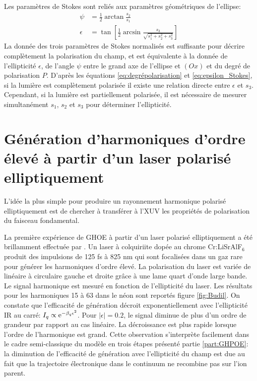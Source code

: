 Les paramètres de Stokes sont reliés aux paramètres géométriques de l'ellipse:
\begin{align}
\psi & = \frac{1}{2} \arctan \frac{s_2}{s_1} \label{eq:PsiStokes} \\
\epsilon & = \tan \left[ \frac{1}{2} \arcsin \frac{s_3}{\sqrt{s_1^2 + s_2^2 + s_3^2}} \right]
\label{eq:epsilon_Stokes}
\end{align}
La donnée des trois paramètres de Stokes normalisés est suffisante pour décrire complètement la polarisation du champ, et est équivalente à la donnée de l'ellipticité $\epsilon$, de l'angle $\psi$ entre le grand axe de l'ellipse et $(Ox)$ et du degré de polarisation $P$. D'après les équations \ref{eq:degrépolarisation} et \ref{eq:epsilon_Stokes}, si la lumière est complètement polarisée il existe une relation directe entre $\epsilon$ et $s_3$. Cependant, si la lumière est partiellement polarisée, il est nécessaire de mesurer simultanément $s_1$, $s_2$ et $s_3$ pour déterminer l'ellipticité.

\section{Génération d'harmoniques d'ordre élevé à partir d'un laser polarisé elliptiquement}
L'idée la plus simple pour produire un rayonnement harmonique polarisé elliptiquement est de chercher à transférer à l'XUV les propriétés de polarisation du faisceau fondamental.

La première expérience de GHOE à partir d'un laser polarisé elliptiquement a été brillamment effectuée par . Un laser à colquiriite dopée au chrome Cr:LiSrAlF$_6$ produit des impulsions de 125 fs à 825 nm qui sont focalisées dans un gaz rare pour générer les harmoniques d'ordre élevé. La polarisation du laser est variée  de linéaire à circulaire gauche et droite grâce à une lame quart d'onde large bande. Le signal harmonique est mesuré en fonction de l'ellipticité du laser. Les résultats pour les harmoniques 15 à 63 dans le néon sont reportés figure \ref{fig:Budil}. On constate que l'efficacité de génération décroit exponentiellement avec l'ellipticité IR au carré: $I_q \propto \mathrm{e}^{- \beta_q \epsilon^2}$. Pour $|\epsilon| = 0.2$, le signal diminue de plus d'un ordre de grandeur par rapport au cas linéaire. La décroissance est plus rapide lorsque l'ordre de l'harmonique est grand. Cette observation s'interprète facilement dans le cadre semi-classique du modèle en trois étapes présenté partie \ref{part:GHPOE}: la diminution de l'efficacité de génération avec l'ellipticité du champ est due au fait que la trajectoire électronique dans le continuum ne recombine pas sur l'ion parent.


